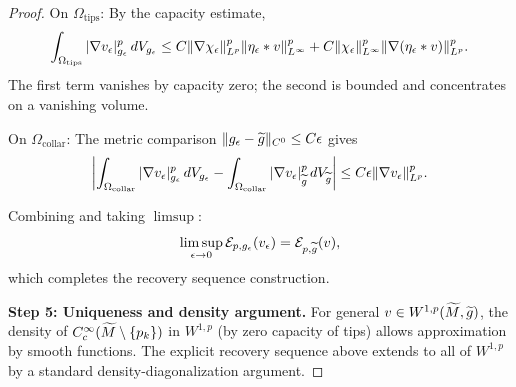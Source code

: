 \begin{proof}
On $\Omega_{\text{tips}}$: By the capacity estimate,
\begin{equation}
    \int_{\Omega_{\text{tips}}} |\nabla v_\epsilon|^p_{g_{\epsilon}} \, dV_{g_{\epsilon}} \le C \|\nabla \chi_\epsilon\|_{L^p}^p \|\eta_\epsilon * v\|_{L^\infty}^p + C \|\chi_\epsilon\|_{L^\infty}^p \|\nabla(\eta_\epsilon * v)\|_{L^p}^p.
\end{equation}
The first term vanishes by capacity zero; the second is bounded and concentrates on a vanishing volume.

On $\Omega_{\text{collar}}$: The metric comparison $\|g_{\epsilon} - \widetilde{g}\|_{C^0} \le C\epsilon$ gives
\begin{equation}
    \left| \int_{\Omega_{\text{collar}}} |\nabla v_\epsilon|^p_{g_{\epsilon}} \, dV_{g_{\epsilon}} - \int_{\Omega_{\text{collar}}} |\nabla v_\epsilon|^p_{\widetilde{g}} \, dV_{\widetilde{g}} \right| \le C\epsilon \|\nabla v_\epsilon\|_{L^p}^p.
\end{equation}

Combining and taking $\limsup$:
\begin{equation}
    \limsup_{\epsilon \to 0} \mathcal{E}_{p,g_{\epsilon}}(v_\epsilon) = \mathcal{E}_{p,\widetilde{g}}(v),
\end{equation}
which completes the recovery sequence construction.

\textbf{Step 5: Uniqueness and density argument.}
For general $v \in W^{1,p}(\widetilde{M}, \widetilde{g})$, the density of $C^\infty_c(\widetilde{M} \setminus \{p_k\})$ in $W^{1,p}$ (by zero capacity of tips) allows approximation by smooth functions. The explicit recovery sequence above extends to all of $W^{1,p}$ by a standard density-diagonalization argument.
\end{proof}

